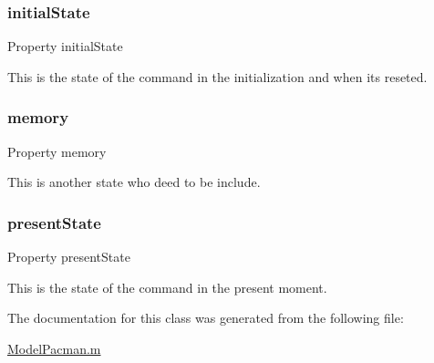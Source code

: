 \subsubsection{\texorpdfstring{initial\+State}{initialState}}
{\footnotesize\ttfamily Property initial\+State}



This is the state of the command in the initialization and when it\textquotesingle{}s reseted. 

\mbox{\label{class_model_pacman_a9a61c54203464d470acd8580a6464f8e}} 
\subsubsection{\texorpdfstring{memory}{memory}}
{\footnotesize\ttfamily Property memory}



This is another state who deed to be include. 

\mbox{\label{class_model_pacman_a9624cc7c421a50fa5086b0ebd0cd5fe3}} 
\subsubsection{\texorpdfstring{present\+State}{presentState}}
{\footnotesize\ttfamily Property present\+State}



This is the state of the command in the present moment. 



The documentation for this class was generated from the following file\+:\begin{DoxyCompactItemize}
\item 
\hyperlink{_model_pacman_8m}{Model\+Pacman.\+m}\end{DoxyCompactItemize}
